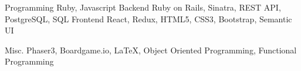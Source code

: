 \vspace{-1.0mm}

\begin{cvskills}

    \cvskill
    {Programming}
    {Ruby, Javascript} %
    \cvskill
    {Backend} %
    {Ruby on Rails, Sinatra, REST API, PostgreSQL, SQL} %
    \cvskill
    {Frontend} %
    {React, Redux, HTML5, CSS3, Bootstrap, Semantic UI} %

    \cvskill
    {Misc.} %
    {Phaser3, Boardgame.io, LaTeX, Object Oriented Programming, Functional Programming} %

\end{cvskills}
